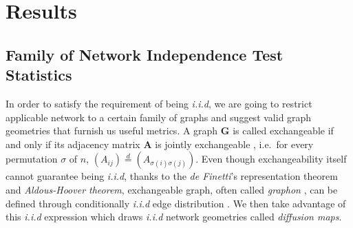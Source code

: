 \documentclass[11pt]{article}
\theoremstyle{definition}
\begin{document}
\section{Results}
\label{sec:method}
	\vspace*{-0.2cm}
\subsection{Family of Network Independence Test Statistics}
\label{ssec:method2}

In order to satisfy the requirement of being \textit{i.i.d}, we are going to restrict applicable network to a certain family of graphs and suggest valid graph geometries that furnish us useful metrics. A graph $\mathbf{G}$ is called exchangeable if and only if its adjacency matrix $\mathbf{A}$ is jointly exchangeable \citep{orbanz2015bayesian}, i.e.~for every permutation $\sigma$ of $n$, $(A_{ij}) \stackrel{d}{=} (A_{\sigma(i) \sigma(j)})$. Even though exchangeability itself cannot guarantee being \textit{i.i.d}, thanks to the \textit{de Finetti}'s representation theorem and \textit{Aldous-Hoover theorem}, exchangeable graph, often called \textit{graphon} \citep{lovasz2006limits}, can be defined through conditionally \textit{i.i.d} edge distribution \citep{chan2013estimation}. We then take advantage of this \textit{i.i.d} expression which draws \textit{i.i.d} network geometries called \textit{diffusion maps}.
\end{document}

